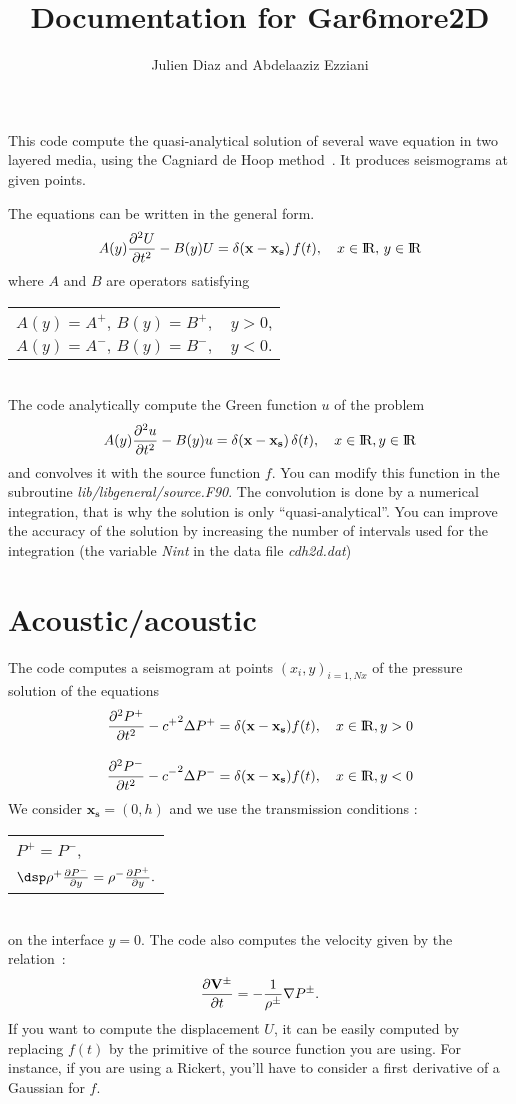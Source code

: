 \documentclass[11pt,a4]{article}
\title{Documentation for Gar6more2D}
\author{Julien Diaz and Abdelaaziz Ezziani}
\begin{document}
\maketitle
This code compute the quasi-analytical solution of
several wave equation in two layered media, using
the Cagniard de Hoop
method~\cite{Cag,DH,VDH,PG,QG,JD,RAP_DE6509,Rap3}. It produces
seismograms at given points.

The equations can be written in the general form.  
\begin{eqnarray}
 A(y)\frac{\partial ^2 U}{\partial t^2}-B(y) U=\delta({\bf x}-{\bf x_s})\,f(t), 
\quad x\in\hbox{I}\!\hbox{R},\,y\in\hbox{I}\!\hbox{R}
\end{eqnarray}
where $A$ and $B$ are operators satisfying\\[10pt]
\begin{tabular}{l}
$A(y)=A^+, \, B(y)=B^+, \quad y>0$, \\
$A(y)=A^-, \, B(y)=B^-, \quad y<0.$
\end{tabular} 
\\[10pt]
The code analytically compute the Green  function $u$ of the problem
\begin{eqnarray}
 A(y)\frac{\partial ^2 u}{\partial t^2}-B(y) u=\delta({\mathbf
   x}-\mathbf{x_s})\,\delta(t), \quad x\in\hbox{I}\!\hbox{R}, y\in\hbox{I}\!\hbox{R}
\end{eqnarray}
and convolves it with the source function $f$. You
can modify this function in the subroutine {\it
  lib/libgeneral/source.F90}. The convolution is
done by a numerical integration, that is why the
solution is only ``quasi-analytical''. You can
improve the accuracy of the solution by increasing the
number of intervals used for the integration (the
variable {\it Nint} in the data file {\it cdh2d.dat})
\section{Acoustic/acoustic}
The code computes a seismogram at points
$(x_i,y)_{i=1,Nx}$ of the pressure solution of the equations
\begin{eqnarray*}
 \frac{\partial ^2 P^+}{\partial t^2}-{c^+}^2 \Delta P^+=\delta({\mathbf x}-\mathbf{x_s})f(t),\quad x\in\hbox{I}\!\hbox{R}, y>0\\[10pt]
 \frac{\partial ^2 P^-}{\partial t^2}-{c^-}^2 \Delta P^-=\delta({\mathbf x}-\mathbf{x_s})f(t),\quad x\in\hbox{I}\!\hbox{R}, y<0
\end{eqnarray*}
We consider $\mathbf{x_s}=(0,h)$ and we use the transmission conditions :\\[10pt]
\begin{tabular}{|l} 
$P^+=P^-$, \\[10pt]
$\dsp \rho^+ \frac{\partial P^-}{\partial y}=\rho^- \frac{\partial P^+}{\partial y} .$
\end{tabular}\\
on the interface $y=0$.
The code also computes the velocity given by the relation~:
$$\frac{\partial \mathbf V^\pm}{\partial t} =-\frac{1}{\rho^\pm}{\mathbf \nabla} P^\pm.$$ 
If you  want to compute  the displacement $U$, it can be easily computed by replacing $f(t)$ by the primitive of the source function you are using. For instance, if you are using a Rickert, you'll have to consider a first derivative of a Gaussian for $f$.  
\end{document}
